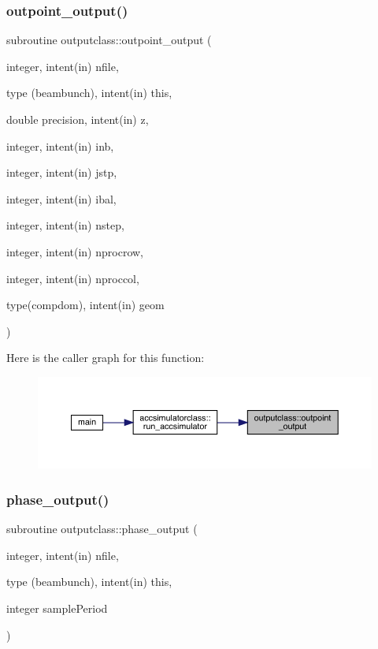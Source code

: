 \subsubsection{\texorpdfstring{outpoint\_output()}{outpoint\_output()}}
{\footnotesize\ttfamily subroutine outputclass\+::outpoint\+\_\+output (\begin{DoxyParamCaption}\item[{integer, intent(in)}]{nfile,  }\item[{type (beambunch), intent(in)}]{this,  }\item[{double precision, intent(in)}]{z,  }\item[{integer, intent(in)}]{inb,  }\item[{integer, intent(in)}]{jstp,  }\item[{integer, intent(in)}]{ibal,  }\item[{integer, intent(in)}]{nstep,  }\item[{integer, intent(in)}]{nprocrow,  }\item[{integer, intent(in)}]{nproccol,  }\item[{type(compdom), intent(in)}]{geom }\end{DoxyParamCaption})}

Here is the caller graph for this function\+:\nopagebreak
\begin{figure}[H]
\begin{center}
\leavevmode
\includegraphics[width=350pt]{namespaceoutputclass_a15a58393664c8a9ded7a8e259fc511e8_icgraph}
\end{center}
\end{figure}
\mbox{\label{namespaceoutputclass_a86742b646a584647da7837ee6fc09c89}} 
\subsubsection{\texorpdfstring{phase\_output()}{phase\_output()}}
{\footnotesize\ttfamily subroutine outputclass\+::phase\+\_\+output (\begin{DoxyParamCaption}\item[{integer, intent(in)}]{nfile,  }\item[{type (beambunch), intent(in)}]{this,  }\item[{integer}]{sample\+Period }\end{DoxyParamCaption})}

